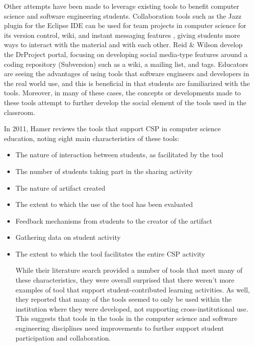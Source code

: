 \begin{itemize}
Other attempts have been made to leverage existing tools to benefit computer science and software engineering students. Collaboration tools such as the Jazz plugin for the Eclipse IDE can be used for team projects in computer science for its version control, wiki, and instant messaging features \cite{meneely2009preparing}, giving students more ways to interact with the material and with each other. Reid \& Wilson \cite{reid2007drproject} develop the DrProject portal, focusing on developing social media-type features around a coding repository (Subversion) such as a wiki, a mailing list, and tags. Educators are seeing the advantages of using tools that software engineers and developers in the real world use, and this is beneficial in that students are familiarized with the tools. Moreover, in many of these cases, the concepts or developments made to these tools attempt to further develop the social element of the tools used in the classroom.

In 2011, Hamer \cite{hamer2011tools} reviews the tools that support CSP in computer science education, noting eight main characteristics of these tools:
\begin{itemize}
\item The nature of interaction between students, as facilitated by the tool
\item The number of students taking part in the sharing activity
\item The nature of artifact created
\item The extent to which the use of the tool has been evaluated
\item Feedback mechanisms from students to the creator of the artifact
\item Gathering data on student activity
\item The extent to which the tool facilitates the entire CSP activity

While their literature search provided a number of tools that meet many of these characteristics, they were overall surprised that there weren’t more examples of tool that support student-contributed learning activities. As well, they reported that many of the tools seemed to only be used within the institution where they were developed, not supporting cross-institutional use. This suggests that tools in the tools in the computer science and software engineering disciplines need improvements to further support student participation and collaboration.


\end{itemize}
\end{itemize}
